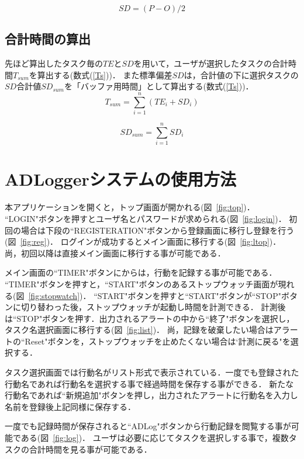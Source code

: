 \begin{equation}
\label{SD}
SD = (P - O)/2
\end{equation}

\subsection{合計時間の算出}

先ほど算出したタスク毎の$TE$と$SD$を用いて，ユーザが選択したタスクの合計時間$T_{sum}$を算出する(数式(\ref{Ts}))．
また標準偏差$SD$は，合計値の下に選択タスクの$SD$合計値$SD_{sum}$を「バッファ用時間」として算出する(数式(\ref{Ts}))．
\begin{equation}
\label{Ts}
T_{sum}= \displaystyle\sum_{i=1}^{n} (TE_{i} + SD_{i})
\end{equation}

\begin{equation}
\label{SDs}
SD_{sum}= \displaystyle\sum_{i=1}^{n}  SD_{i}
\end{equation}



\section{ADLoggerシステムの使用方法}
本アプリケーションを開くと，トップ画面が開かれる(図~\ref{fig:top})．
``LOGIN"ボタンを押すとユーザ名とパスワードが求められる(図~\ref{fig:login})．
初回の場合は下段の``REGISTERATION"ボタンから登録画面に移行し登録を行う(図~\ref{fig:reg})．
ログインが成功するとメイン画面に移行する(図~\ref{fig:ltop})．
尚，初回以降は直接メイン画面に移行する事が可能である．

メイン画面の``TIMER"ボタンにからは，行動を記録する事が可能である．
``TIMER"ボタンを押すと，``START"ボタンのあるストップウォッチ画面が現れる(図~\ref{fig:stopwatch})．
``START"ボタンを押すと``START"ボタンが``STOP"ボタンに切り替わった後，ストップウォッチが起動し時間を計測できる．
計測後は``STOP"ボタンを押す．出力されるアラートの中から``終了"ボタンを選択し，タスク名選択画面に移行する(図~\ref{fig:list})．
尚，記録を破棄したい場合はアラートの``Reset"ボタンを，ストップウォッチを止めたくない場合は`計測に戻る"を選択する．

タスク選択画面では行動名がリスト形式で表示されている．一度でも登録された行動名であれば行動名を選択する事で経過時間を保存する事ができる．
新たな行動名であれば``新規追加"ボタンを押し，出力されたアラートに行動名を入力し名前を登録後上記同様に保存する．

一度でも記録時間が保存されると``ADLog"ボタンから行動記録を閲覧する事が可能である(図~\ref{fig:log})．
ユーザは必要に応じてタスクを選択しする事で，複数タスクの合計時間を見る事が可能である．


